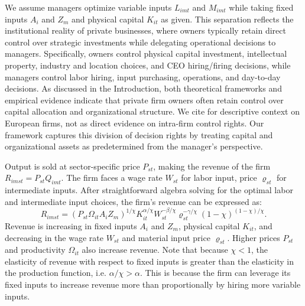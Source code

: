 \documentclass[11pt,a4paper]{article}
\begin{document}
We assume managers optimize variable inputs $L_{imt}$ and $M_{imt}$ while taking fixed inputs $A_{i}$ and $Z_m$ and physical capital $K_{it}$ as given. This separation reflects the institutional reality of private businesses, where owners typically retain direct control over strategic investments while delegating operational decisions to managers. Specifically, owners control physical capital investment, intellectual property, industry and location choices, and CEO hiring/firing decisions, while managers control labor hiring, input purchasing, operations, and day-to-day decisions. As discussed in the Introduction, both theoretical frameworks \citep{fama1983separation, jensen1976theory, burkart2003family} and empirical evidence \citep{bloom2012organization} indicate that private firm owners often retain control over capital allocation and organizational structure. We cite \citet{Navaretti2010EFIGE} for descriptive context on European firms, not as direct evidence on intra-firm control rights. Our framework captures this division of decision rights by treating capital and organizational assets as predetermined from the manager's perspective.

Output is sold at sector-specific price $P_{st}$, making the revenue of the firm $R_{imst} = P_{st}Q_{imt}$. The firm faces a wage rate $W_{st}$ for labor input, price $\varrho_{st}$ for intermediate inputs. After straightforward algebra solving for the optimal labor and intermediate input choices, the firm's revenue can be expressed as:
\begin{equation}\label{eq:revenue}
R_{imst} = (P_{st}\Omega_{it}A_i Z_m)^{1/\chi}
K_{it}^{\alpha/\chi}
W_{st}^{-\beta/\chi}
\varrho_{st}^{-\gamma/\chi}
(1-\chi)^{(1-\chi)/\chi}.
\end{equation}
Revenue is increasing in fixed inputs $A_i$ and $Z_m$, physical capital $K_{it}$, and decreasing in the wage rate $W_{st}$ and material input price $\varrho_{st}$. Higher prices $P_{st}$ and productivity $\Omega_{it}$ also increase revenue. Note that because $\chi<1$, the elasticity of revenue with respect to fixed inputs is greater than the elasticity in the production function, i.e. $\alpha/\chi > \alpha$. This is because the firm can leverage its fixed inputs to increase revenue more than proportionally by hiring more variable inputs.
\end{document}

